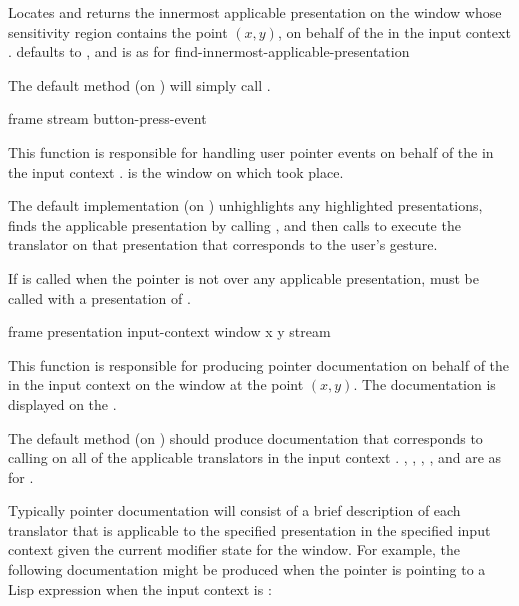 Locates and returns the innermost applicable presentation on the window
 whose sensitivity region contains the point $(x,y)$, on behalf of
the   in the input context .
 defaults to , and is as for
{find-innermost-applicable-presentation}

The default method (on ) will simply call
.

 {frame stream button-press-event}

This function is responsible for handling user pointer events on behalf of the
  in the input context .
 is the window on which  took place.

The default implementation (on ) unhighlights any
highlighted presentations, finds the applicable presentation by calling
, and then calls
 to execute the translator on that
presentation that corresponds to the user's gesture.

If  is called when the pointer is
not over any applicable presentation,  must
be called with a presentation of .


 {frame presentation input-context window x y stream}

This function is responsible for producing pointer documentation on behalf of
the   in the input context  on the
window  at the point $(x,y)$.  The documentation is displayed on the
 .

The default method (on ) should produce
documentation that corresponds to calling 
on all of the applicable translators in the input context .
, , , , and  are as for
.

Typically pointer documentation will consist of a brief description of each
translator that is applicable to the specified presentation in the specified
input context given the current modifier state for the window.  For example, the
following documentation might be produced when the pointer is pointing to a Lisp
expression when the input context is :

